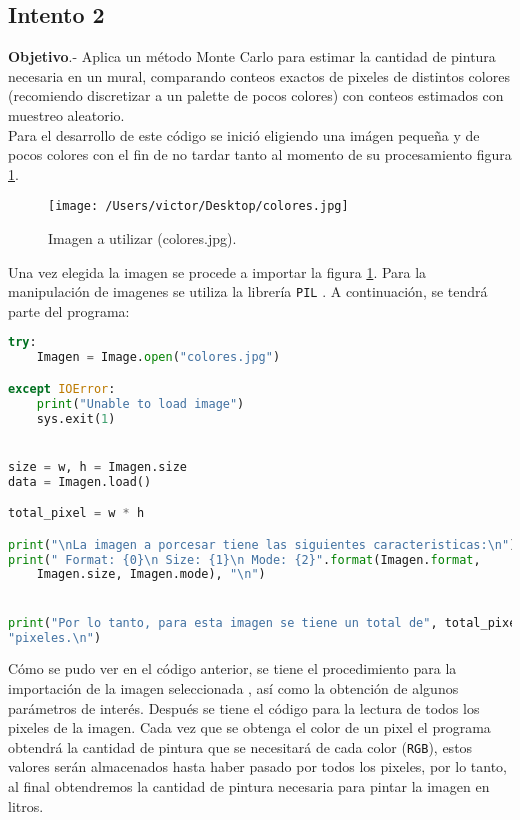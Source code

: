 \documentclass{article}
\begin{document}
\subsection{Intento 2}
\textbf{Objetivo}.- Aplica un método Monte Carlo para estimar la cantidad de pintura necesaria en un mural, comparando conteos exactos de pixeles de distintos colores (recomiendo discretizar a un palette de pocos colores) con conteos estimados con muestreo aleatorio.\\

Para el desarrollo de este código se inició eligiendo una imágen pequeña y de pocos colores con el fin de no tardar tanto al momento de su procesamiento figura \ref{fig:cuadro.1}. \\

\begin{figure}[H]
\begin{center}
	\texttt{[image: /Users/victor/Desktop/colores.jpg]}
	\caption{ Imagen a utilizar (colores.jpg).}
	\label{fig:cuadro.1}
\end{center}
\end{figure}

Una vez elegida la imagen se procede a importar la figura \ref{fig:cuadro.1}. Para la manipulación de imagenes se utiliza la librería \texttt{PIL} . A continuación, se tendrá parte del programa:  


\begin{lstlisting}[language=Python]
        try:
    Imagen = Image.open("colores.jpg")

except IOError:
    print("Unable to load image")
    sys.exit(1)


size = w, h = Imagen.size
data = Imagen.load()

total_pixel = w * h

print("\nLa imagen a porcesar tiene las siguientes caracteristicas:\n")
print(" Format: {0}\n Size: {1}\n Mode: {2}".format(Imagen.format,
    Imagen.size, Imagen.mode), "\n")


print("Por lo tanto, para esta imagen se tiene un total de", total_pixel, 
"pixeles.\n")

 \end{lstlisting}
 
 
Cómo se pudo ver en el código anterior, se tiene el procedimiento para la importación de la imagen seleccionada , así como la obtención de algunos parámetros de interés. Después se tiene el código para la lectura de todos los pixeles de la imagen. Cada vez que se obtenga el color de un pixel el programa obtendrá la cantidad de pintura que se necesitará de cada color (\texttt{RGB}), estos valores serán almacenados hasta haber pasado por todos los pixeles, por lo tanto, al final obtendremos la cantidad de pintura necesaria para pintar la imagen en litros.\\
 
\end{document}

